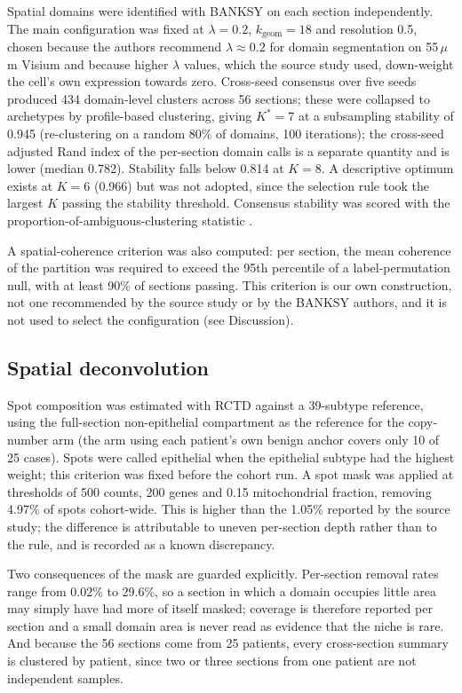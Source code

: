 Spatial domains were identified with BANKSY \citep{singhal2024banksy} on each section
independently. The main
configuration was fixed at $\lambda=0.2$, $k_{\text{geom}}=18$ and resolution 0.5, chosen
because the authors recommend $\lambda\approx0.2$ for domain segmentation on 55\,$\mu$m
Visium and because higher $\lambda$ values, which the source study used, down-weight the
cell's own expression towards zero. Cross-seed consensus over five seeds produced 434
domain-level clusters across 56 sections; these were collapsed to archetypes by
profile-based clustering, giving $K^{*}=7$ at a subsampling stability of 0.945 (re-clustering on a random 80\% of
domains, 100 iterations); the cross-seed adjusted Rand index of the per-section domain
calls is a separate quantity and is lower (median 0.782). Stability
falls below 0.814 at $K=8$. A descriptive optimum exists at $K=6$ (0.966) but was not
adopted, since the selection rule took the largest $K$ passing the stability threshold.
Consensus stability was scored with the proportion-of-ambiguous-clustering statistic
\citep{senbabaoglu2014pac}.

A spatial-coherence criterion was also computed: per section, the mean coherence of the
partition was required to exceed the 95th percentile of a label-permutation null, with at
least 90\% of sections passing. This criterion is our own construction, not one recommended
by the source study or by the BANKSY authors, and it is not used to select the
configuration (see Discussion).

\subsection{Spatial deconvolution}

Spot composition was estimated with RCTD \citep{cable2022rctd} against a 39-subtype
reference, using the
full-section non-epithelial compartment as the reference for the copy-number arm (the
arm using each patient's own benign anchor covers only 10 of 25 cases). Spots were called
epithelial when the epithelial subtype had the highest weight; this criterion was fixed
before the cohort run. A spot mask was applied at thresholds of 500 counts, 200 genes and
0.15 mitochondrial fraction, removing 4.97\% of spots cohort-wide. This is higher than the
1.05\% reported by the source study; the difference is attributable to uneven per-section
depth rather than to the rule, and is recorded as a known discrepancy.

Two consequences of the mask are guarded explicitly. Per-section removal rates range from
0.02\% to 29.6\%, so a section in which a domain occupies little area may simply have had
more of itself masked; coverage is therefore reported per section and a small domain area is
never read as evidence that the niche is rare. And because the 56 sections come from 25
patients, every cross-section summary is clustered by patient, since two or three sections from
one patient are not independent samples.

